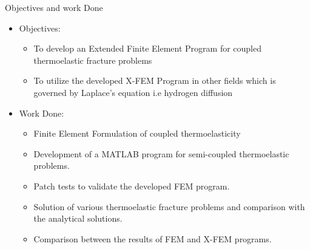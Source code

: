\documentclass{beamer}
\begin{document}
\begin{frame}[t,fragile]{Objectives and work Done}
    \begin{itemize}
          \item Objectives:
            \begin{itemize}
                    \footnotesize
                  \item To develop an Extended Finite Element Program for coupled thermoelastic fracture problems 
                  \item To utilize the developed X-FEM Program in other fields which is governed by Laplace's equation i.e hydrogen diffusion 
                \end{itemize}
              \item Work Done:
    \begin{itemize}
                    \footnotesize
         \item Finite Element Formulation of coupled thermoelasticity 
         \item Development of a MATLAB program for semi-coupled thermoelastic problems.
         \item Patch tests to validate the developed FEM program.
         \item Solution of various thermoelastic fracture problems and comparison with the analytical solutions. 
         \item Comparison between the results of FEM and X-FEM programs. 
    \end{itemize}
    \end{itemize}
\end{frame}
\end{document}
